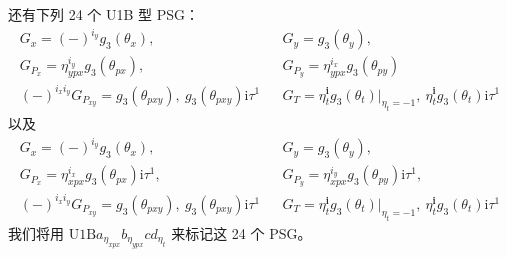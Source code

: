 还有下列 24 个 U1B 型 PSG：
\begin{equation*}
\begin{array}{rcl}
G_{x}=(-)^{i_{y}}g_{3}(\theta_{x}), & & G_{y}=g_{3}(\theta_{y}),\\[2pt]
G_{P_{x}}=\eta_{ypx}^{i_{y}}g_{3}(\theta_{px}), & & G_{P_{y}}=\eta_{ypx}^{i_{x}}g_{3}(\theta_{py})\\[2pt]
(-)^{i_{x}i_{y}}G_{P_{xy}}=g_{3}(\theta_{pxy}),\ g_{3}(\theta_{pxy})\mathrm{i}\tau^{1} & & G_{T}=\eta_{t}^{\pmb{i}}g_{3}(\theta_{t})\big|_{\eta_{t}=-1},\ \eta_{t}^{\pmb{i}}g_{3}(\theta_{t})\mathrm{i}\tau^{1}
\end{array}
\tag{9.4.23}
\end{equation*}
以及
\begin{equation*}
\begin{array}{rcl}
G_{x}=(-)^{i_{y}}g_{3}(\theta_{x}), & & G_{y}=g_{3}(\theta_{y}),\\[2pt]
G_{P_{x}}=\eta_{xpx}^{i_{x}}g_{3}(\theta_{px})\mathrm{i}\tau^{1}, & & G_{P_{y}}=\eta_{xpx}^{i_{y}}g_{3}(\theta_{py})\mathrm{i}\tau^{1},\\[2pt]
(-)^{i_{x}i_{y}}G_{P_{xy}}=g_{3}(\theta_{pxy}),\ g_{3}(\theta_{pxy})\mathrm{i}\tau^{1} & & G_{T}=\eta_{t}^{\pmb{i}}g_{3}(\theta_{t})\big|_{\eta_{t}=-1},\ \eta_{t}^{\pmb{i}}g_{3}(\theta_{t})\mathrm{i}\tau^{1}
\end{array}
\tag{9.4.24}
\end{equation*}
我们将用 $\text{U1B}a_{\eta_{xpx}}b_{\eta_{ypx}}cd_{\eta_{t}}$ 来标记这 24 个 PSG。

